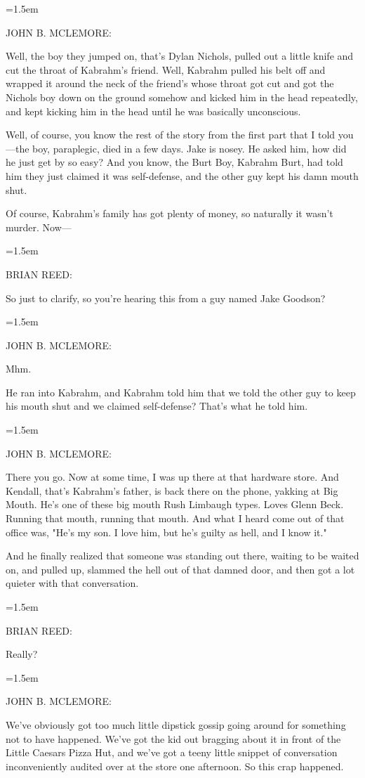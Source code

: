 \documentclass[10pt,a4paper]{article}
\newcommand{\speakerlabel}[1]{{\plantin\color{speakerblue}\MakeUppercase{#1}:}}
\newenvironment{speech}[1]{%
		\par\medskip
		\begin{list}{}{%
			\leftmargin=1.5em
			\rightmargin=0pt
			\topsep=0pt
			\partopsep=0pt
			\parsep=0.5\baselineskip
			\itemsep=0pt}%
		\item\speakerlabel{#1}\enspace\ignorespaces
	}{\end{list}}
\newenvironment{narration}[1]{%
		\par\medskip\noindent\speakerlabel{#1}\enspace\ignorespaces
	}{\par\medskip}
\begin{document}
\begin{speech}{JOHN B. McLEMORE}
Well, the boy they jumped on, that's Dylan Nichols, pulled out a little knife and cut the throat of Kabrahm's friend. Well, Kabrahm pulled his belt off and wrapped it around the neck of the friend's whose throat got cut and got the Nichols boy down on the ground somehow and kicked him in the head repeatedly, and kept kicking him in the head until he was basically unconscious.

Well, of course, you know the rest of the story from the first part that I told you—the boy, paraplegic, died in a few days. Jake is nosey. He asked him, how did he just get by so easy? And you know, the Burt Boy, Kabrahm Burt, had told him they just claimed it was self-defense, and the other guy kept his damn mouth shut.

Of course, Kabrahm's family has got plenty of money, so naturally it wasn't murder. Now—
\end{speech}
\begin{speech}{BRIAN REED}
So just to clarify, so you're hearing this from a guy named Jake Goodson?
\end{speech}
\begin{speech}{JOHN B. McLEMORE}
Mhm.
\end{speech}
\begin{narration}{BRIAN REED}
He ran into Kabrahm, and Kabrahm told him that we told the other guy to keep his mouth shut and we claimed self-defense? That's what he told him.
\end{narration}
\begin{speech}{JOHN B. McLEMORE}
There you go. Now at some time, I was up there at that hardware store. And Kendall, that's Kabrahm's father, is back there on the phone, yakking at Big Mouth. He's one of these big mouth Rush Limbaugh types. Loves Glenn Beck. Running that mouth, running that mouth. And what I heard come out of that office was, "He's my son. I love him, but he's guilty as hell, and I know it."

And he finally realized that someone was standing out there, waiting to be waited on, and pulled up, slammed the hell out of that damned door, and then got a lot quieter with that conversation.
\end{speech}
\begin{speech}{BRIAN REED}
Really?
\end{speech}
\begin{speech}{JOHN B. McLEMORE}
We've obviously got too much little dipstick gossip going around for something not to have happened. We've got the kid out bragging about it in front of the Little Caesars Pizza Hut, and we've got a teeny little snippet of conversation inconveniently audited over at the store one afternoon. So this crap happened.
\end{speech}
\end{document}
